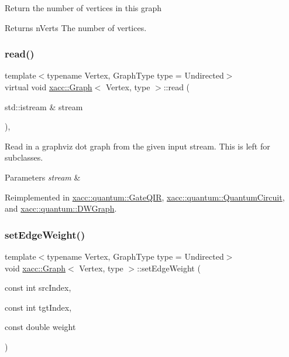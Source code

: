 Return the number of vertices in this graph

\begin{DoxyReturn}{Returns}
n\+Verts The number of vertices. 
\end{DoxyReturn}
\mbox{\label{a01211_abdd3e67dc08c223821d809bc8914164a}} 
\subsubsection{\texorpdfstring{read()}{read()}}
{\footnotesize\ttfamily template$<$typename Vertex, Graph\+Type type = Undirected$>$ \\
virtual void \hyperlink{a01211}{xacc\+::\+Graph}$<$ Vertex, type $>$\+::read (\begin{DoxyParamCaption}\item[{std\+::istream \&}]{stream }\end{DoxyParamCaption})\hspace{0.3cm}{\ttfamily [inline]}, {\ttfamily [virtual]}}

Read in a graphviz dot graph from the given input stream. This is left for subclasses.


\begin{DoxyParams}{Parameters}
{\em stream} & \\
\hline
\end{DoxyParams}


Reimplemented in \hyperlink{a01027_a26019e2f1e13e64645e29aee86ac58b1}{xacc\+::quantum\+::\+Gate\+Q\+IR}, \hyperlink{a01103_af7a7f4a487d493fe8a4ed1f76cefd731}{xacc\+::quantum\+::\+Quantum\+Circuit}, and \hyperlink{a00975_a008ef5c6434494fddb4ec8f0f4895c75}{xacc\+::quantum\+::\+D\+W\+Graph}.

\mbox{\label{a01211_aaf1edd0f038f6cca1c3c9ece35d3ec05}} 
\subsubsection{\texorpdfstring{set\+Edge\+Weight()}{setEdgeWeight()}}
{\footnotesize\ttfamily template$<$typename Vertex, Graph\+Type type = Undirected$>$ \\
void \hyperlink{a01211}{xacc\+::\+Graph}$<$ Vertex, type $>$\+::set\+Edge\+Weight (\begin{DoxyParamCaption}\item[{const int}]{src\+Index,  }\item[{const int}]{tgt\+Index,  }\item[{const double}]{weight }\end{DoxyParamCaption})\hspace{0.3cm}{\ttfamily [inline]}}

